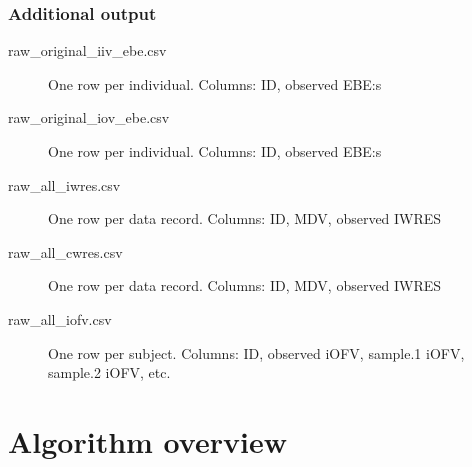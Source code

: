 \subsubsection*{Additional output}
\begin{description}
\item[raw\_original\_iiv\_ebe.csv]  One row per individual. Columns: ID, observed EBE:s
\item[raw\_original\_iov\_ebe.csv]  One row per individual. Columns: ID, observed EBE:s
\item[raw\_all\_iwres.csv] One row per data record. Columns: ID, MDV, observed IWRES %
\item[raw\_all\_cwres.csv] One row per data record. Columns: ID, MDV, observed IWRES %
\item[raw\_all\_iofv.csv] One row per subject. Columns: ID, observed iOFV, sample.1 iOFV, sample.2 iOFV, etc. 
\end{description}

\section{Algorithm overview}

